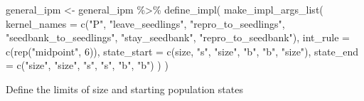 \documentclass[
]{article}
\newenvironment{Shaded}{\begin{snugshade}}{\end{snugshade}}
\newcommand{\AttributeTok}[1]{\textcolor[rgb]{0.77,0.63,0.00}{#1}}
\newcommand{\DecValTok}[1]{\textcolor[rgb]{0.00,0.00,0.81}{#1}}
\newcommand{\FunctionTok}[1]{\textcolor[rgb]{0.00,0.00,0.00}{#1}}
\newcommand{\NormalTok}[1]{#1}
\newcommand{\OtherTok}[1]{\textcolor[rgb]{0.56,0.35,0.01}{#1}}
\newcommand{\SpecialCharTok}[1]{\textcolor[rgb]{0.00,0.00,0.00}{#1}}
\newcommand{\StringTok}[1]{\textcolor[rgb]{0.31,0.60,0.02}{#1}}
\begin{document}
\begin{Shaded}
\begin{Highlighting}[]
\NormalTok{general\_ipm }\OtherTok{\textless{}{-}}\NormalTok{ general\_ipm }\SpecialCharTok{\%\textgreater{}\%}
  \FunctionTok{define\_impl}\NormalTok{(}
    \FunctionTok{make\_impl\_args\_list}\NormalTok{(}
      \AttributeTok{kernel\_names =} \FunctionTok{c}\NormalTok{(}\StringTok{"P"}\NormalTok{, }\StringTok{"leave\_seedlings"}\NormalTok{, }\StringTok{"repro\_to\_seedlings"}\NormalTok{, }\StringTok{"seedbank\_to\_seedlings"}\NormalTok{, }\StringTok{"stay\_seedbank"}\NormalTok{, }\StringTok{"repro\_to\_seedbank"}\NormalTok{),}
      \AttributeTok{int\_rule     =} \FunctionTok{c}\NormalTok{(}\FunctionTok{rep}\NormalTok{(}\StringTok{"midpoint"}\NormalTok{, }\DecValTok{6}\NormalTok{)),}
      \AttributeTok{state\_start    =} \FunctionTok{c}\NormalTok{(}\StringTok{\textquotesingle{}size\textquotesingle{}}\NormalTok{, }\StringTok{"s"}\NormalTok{, }\StringTok{"size"}\NormalTok{, }\StringTok{"b"}\NormalTok{, }\StringTok{"b"}\NormalTok{, }\StringTok{"size"}\NormalTok{),}
      \AttributeTok{state\_end      =} \FunctionTok{c}\NormalTok{(}\StringTok{"size"}\NormalTok{, }\StringTok{"size"}\NormalTok{, }\StringTok{"s"}\NormalTok{, }\StringTok{"s"}\NormalTok{, }\StringTok{"b"}\NormalTok{, }\StringTok{"b"}\NormalTok{)}
\NormalTok{    )}
\NormalTok{  )}
\end{Highlighting}
\end{Shaded}

Define the limits of size and starting population states
\end{document}
